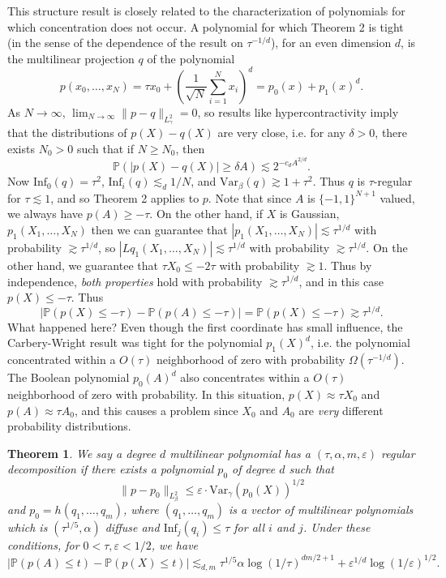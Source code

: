 \documentclass[12pt]{article}
\newtheorem{theorem}{Theorem}
\begin{document}
This structure result is closely related to the characterization of polynomials for which concentration does not occur. A polynomial for which Theorem 2 is tight (in the sense of the dependence of the result on $\tau^{-1/d}$), for an even dimension $d$, is the multilinear projection $q$ of the polynomial
%
\[ p(x_0,\dots,x_N) = \tau x_0 + \left( \frac{1}{\sqrt{N}} \sum_{i=1}^N x_i \right)^d = p_0(x) + p_1(x)^d. \]
%
As $N \to \infty$, $\lim_{N \to \infty} \| p - q \|_{L^2_\gamma} = 0$, so results like hypercontractivity imply that the distributions of $p(X) - q(X)$ are very close, i.e. for any $\delta > 0$, there exists $N_0 > 0$ such that if $N \geq N_0$, then
%
\[ \mathbb{P}(|p(X) - q(X)| \geq \delta A) \lesssim 2^{- c_d A^{2/d}}. \]
%
Now $\text{Inf}_0(q) = \tau^2$, $\text{Inf}_i(q) \lesssim_d 1/N$, and $\text{Var}_\beta(q) \gtrsim 1 + \tau^2$. Thus $q$ is $\tau$-regular for $\tau \lesssim 1$, and so Theorem 2 applies to $p$. Note that since $A$ is $\{ -1, 1 \}^{N+1}$ valued, we always have $p(A) \geq -\tau$. On the other hand, if $X$ is Gaussian, $p_1(X_1,\dots,X_N)$ then we can guarantee that $|p_1(X_1,\dots,X_N)| \lesssim \tau^{1/d}$ with probability $\gtrsim \tau^{1/d}$, so $|Lq_1(X_1,\dots,X_N)| \lesssim \tau^{1/d}$ with probability $\gtrsim \tau^{1/d}$. On the other hand, we guarantee that $\tau X_0 \leq -2 \tau$ with probability $\gtrsim 1$. Thus by independence, \emph{both properties} hold with probability $\gtrsim \tau^{1/d}$, and in this case $p(X) \leq - \tau$. Thus
%
\[ |\mathbb{P}(p(X) \leq - \tau) - \mathbb{P}(p(A) \leq -\tau)| = \mathbb{P}(p(X) \leq -\tau) \gtrsim \tau^{1/d}. \]
What happened here? Even though the first coordinate has small influence, the Carbery-Wright result was tight for the polynomial $p_1(X)^d$, i.e. the polynomial concentrated within a $O(\tau)$ neighborhood of zero with probability $\Omega(\tau^{-1/d})$. The Boolean polynomial $p_0(A)^d$ also concentrates within a $O(\tau)$ neighborhood of zero with probability. In this situation, $p(X) \approx \tau X_0$ and $p(A) \approx \tau A_0$, and this causes a problem since $X_0$ and $A_0$ are \emph{very} different probability distributions.

\begin{theorem}
    We say a degree $d$ multilinear polynomial has a $(\tau, \alpha, m, \varepsilon)$ regular decomposition if there exists a polynomial $p_0$ of degree $d$ such that
    \[  \| p - p_0 \|_{L^2_\beta} \leq \varepsilon \cdot \text{Var}_\gamma(p_0(X))^{1/2} \]
    and $p_0 = h(q_1,\dots,q_m)$, where $(q_1,\dots,q_m)$ is a vector of multilinear polynomials which is $(\tau^{1/5}, \alpha)$ diffuse and $\text{Inf}_j(q_i) \leq \tau$ for all $i$ and $j$. Under these conditions, for $0 < \tau, \varepsilon < 1/2$, we have
    \[ |\mathbb{P}(p(A) \leq t) - \mathbb{P}(p(X) \leq t)| \lesssim_{d,m} \tau^{1/5} \alpha \log(1/\tau)^{dm / 2 + 1} + \varepsilon^{1/d} \log(1/\varepsilon)^{1/2}. \]
\end{theorem}
\end{document}
